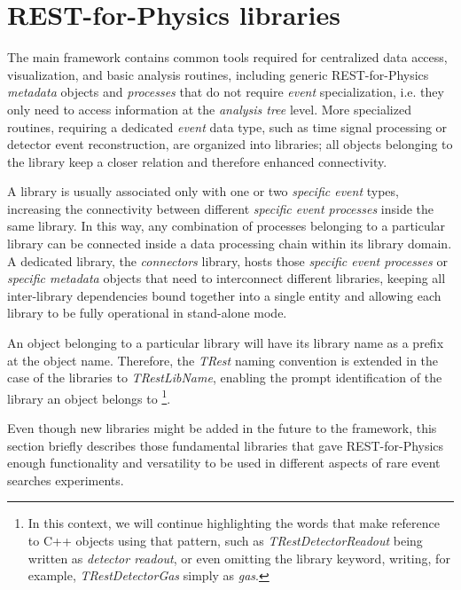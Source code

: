 \section{REST-for-Physics libraries}

\label{sec:libraries}

The main framework contains common tools required for centralized data access, visualization, and basic analysis routines, including generic REST-for-Physics \emph{metadata} objects and \emph{processes} that do not require \emph{event} specialization, i.e. they only need to access information at the \emph{analysis tree} level. More specialized routines, requiring a dedicated \emph{event} data type, such as time signal processing or detector event reconstruction, are organized into libraries; all objects belonging to the library keep a closer relation and therefore enhanced connectivity.

A library is usually associated only with one or two \emph{specific event} types, increasing the connectivity between different \emph{specific event processes} inside the same library. In this way, any combination of processes belonging to a particular library can be connected inside a data processing chain within its library domain. A dedicated library, the \emph{connectors} library, hosts those \emph{specific event processes} or \emph{specific metadata} objects that need to interconnect different libraries, keeping all inter-library dependencies bound together into a single entity and allowing each library to be fully operational in stand-alone mode.

An object belonging to a particular library will have its library name as a prefix at the object name. Therefore, the \emph{TRest} naming convention is extended in the case of the libraries to \emph{TRestLibName}, enabling the prompt identification of the library an object belongs to \footnote{In this context, we will continue highlighting the words that make reference to C++ objects using that pattern, such as \emph{TRestDetectorReadout} being written as \emph{detector readout}, or even omitting the library keyword, writing, for example, \emph{TRestDetectorGas} simply as \emph{gas}.}.

Even though new libraries might be added in the future to the framework, this section briefly describes those fundamental libraries that gave REST-for-Physics enough functionality and versatility to be used in different aspects of rare event searches experiments.

